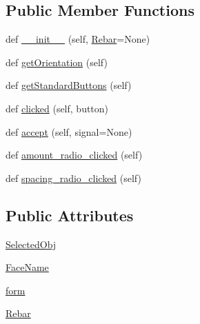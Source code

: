\subsection*{Public Member Functions}
\begin{DoxyCompactItemize}
\item 
def \hyperlink{classBentShapeRebar_1_1__BentShapeRebarTaskPanel_a0f978d5a751619f8ae7dfe178fb0473e}{\+\_\+\+\_\+init\+\_\+\+\_\+} (self, \hyperlink{classBentShapeRebar_1_1__BentShapeRebarTaskPanel_aae8fd4e66d675c566d0afcee0af2341f}{Rebar}=None)
\item 
def \hyperlink{classBentShapeRebar_1_1__BentShapeRebarTaskPanel_ab33579342d5fa4d4bf0bc8c9b9dfa526}{get\+Orientation} (self)
\item 
def \hyperlink{classBentShapeRebar_1_1__BentShapeRebarTaskPanel_af363d8287c33547f2b7fc6f6f326d47a}{get\+Standard\+Buttons} (self)
\item 
def \hyperlink{classBentShapeRebar_1_1__BentShapeRebarTaskPanel_ae92dd6ab03c4b967b064fac00fa0d906}{clicked} (self, button)
\item 
def \hyperlink{classBentShapeRebar_1_1__BentShapeRebarTaskPanel_afdcf71c6a16711a535971366558ea918}{accept} (self, signal=None)
\item 
def \hyperlink{classBentShapeRebar_1_1__BentShapeRebarTaskPanel_ad99f80f17842220db5920e1926ff45a2}{amount\+\_\+radio\+\_\+clicked} (self)
\item 
def \hyperlink{classBentShapeRebar_1_1__BentShapeRebarTaskPanel_a7fb1b14fac066c36380036c6d3f3ab4a}{spacing\+\_\+radio\+\_\+clicked} (self)
\end{DoxyCompactItemize}
\subsection*{Public Attributes}
\begin{DoxyCompactItemize}
\item 
\hyperlink{classBentShapeRebar_1_1__BentShapeRebarTaskPanel_a24d363ab6c058ce4436a2b29e9c0b279}{Selected\+Obj}
\item 
\hyperlink{classBentShapeRebar_1_1__BentShapeRebarTaskPanel_a499514a87885d4c9462e3c6dc314ec9c}{Face\+Name}
\item 
\hyperlink{classBentShapeRebar_1_1__BentShapeRebarTaskPanel_acbe07c5ace61552cc4e4899b668d93e5}{form}
\item 
\hyperlink{classBentShapeRebar_1_1__BentShapeRebarTaskPanel_aae8fd4e66d675c566d0afcee0af2341f}{Rebar}
\end{DoxyCompactItemize}


